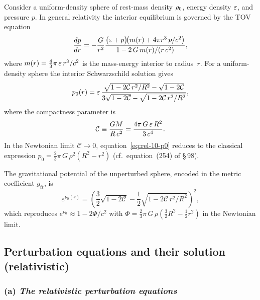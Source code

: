 Consider a uniform-density sphere of rest-mass density $\rho_0$,
energy density $\varepsilon$, and pressure $p$.  In general relativity
the interior equilibrium is governed by the TOV equation
\begin{equation}\label{eq:rel-10-TOV}
  \frac{dp}{dr}
  = -\frac{G}{r^{2}}
    \frac{\bigl(\varepsilon + p\bigr)\!\bigl(m(r) + 4\pi r^{3}\,p/c^{2}\bigr)}
         {1 - 2\,G\,m(r)/(r\,c^{2})},
\end{equation}
where $m(r) = \tfrac{4}{3}\pi\,\varepsilon\,r^{3}/c^{2}$ is the
mass-energy interior to radius~$r$.  For a uniform-density sphere
the interior Schwarzschild solution gives
\begin{equation}\label{eq:rel-10-p0}
  p_{0}(r)
  = \varepsilon\,
    \frac{\sqrt{1-2\mathcal{C}\,r^{2}/R^{2}}
          - \sqrt{1-2\mathcal{C}}}
         {3\sqrt{1-2\mathcal{C}}
          - \sqrt{1-2\mathcal{C}\,r^{2}/R^{2}}},
\end{equation}
where the compactness parameter is
\begin{equation}\label{eq:rel-10-compact}
  \mathcal{C} \equiv \frac{GM}{R\,c^{2}}
  = \frac{4\pi\,G\,\varepsilon\,R^{2}}{3\,c^{4}}.
\end{equation}
In the Newtonian limit $\mathcal{C}\to 0$, equation~\eqref{eq:rel-10-p0}
reduces to the classical expression
$p_{0} = \tfrac{2}{3}\pi\,G\,\rho^{2}(R^{2}-r^{2})$
(cf.\ equation~(254) of \S\,98).

The gravitational potential of the unperturbed sphere, encoded in the
metric coefficient $g_{tt}$, is
\begin{equation}\label{eq:rel-10-g00}
  e^{\nu_{0}(r)}
  = \left(\frac{3}{2}\sqrt{1-2\mathcal{C}}
          - \frac{1}{2}\sqrt{1-2\mathcal{C}\,r^{2}/R^{2}}\right)^{\!2},
\end{equation}
which reproduces $e^{\nu_{0}} \approx 1 - 2\Phi/c^{2}$ with
$\Phi = \tfrac{2}{3}\pi\,G\,\rho(\tfrac{3}{2}R^{2}-\tfrac{1}{2}r^{2})$
in the Newtonian limit.

\subsection{Perturbation equations and their solution (relativistic)}
\label{sec:rel-10-98a}

\subsubsection*{(a) \textit{The relativistic perturbation equations}}

